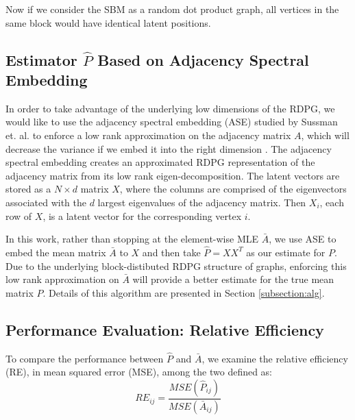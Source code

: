 Now if we consider the SBM as a random dot product graph, all vertices in the same block would have identical latent positions.



\subsection{Estimator $\hat{P}$ Based on Adjacency Spectral Embedding}
In order to take advantage of the underlying low dimensions of the RDPG,  we would like to use the adjacency spectral embedding (ASE) studied by Sussman et. al. to enforce a low rank approximation on the adjacency matrix $A$, which will decrease the variance if we embed it into the right dimension \cite{sussman2012consistent}.  The adjacency spectral embedding creates an approximated RDPG representation of the adjacency matrix from its low rank eigen-decomposition.  The latent vectors are stored as a $N \times d$ matrix $X$, where the columns are comprised of the eigenvectors associated with the $d$ largest eigenvalues of the adjacency matrix. Then $X_i$, each row of $X$, is a latent vector for the corresponding vertex $i$.

In this work, rather than stopping at the element-wise MLE $\bar{A}$, we use ASE to embed the mean matrix $\bar{A}$ to $X$ and then take $\hat{P} = X X^T$ as our estimate for $P$.  Due to the underlying block-distibuted RDPG structure of graphs, enforcing this low rank approximation on $\bar{A}$ will provide a better estimate for the true mean matrix $P$.  Details of this algorithm are presented in Section \ref{subsection:alg}.

\subsection{Performance Evaluation: Relative Efficiency}
To compare the performance between $\hat{P}$ and $\bar{A}$, we examine the relative efficiency (RE), in mean squared error (MSE), among the two defined as:
\begin{equation}
RE_{ij} = \frac{MSE(\hat{P}_{ij})}{MSE(\bar{A}_{ij})}
\end{equation}
